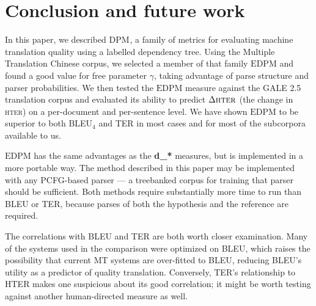 \documentclass[11pt]{article}
\newcommand{\DPM}[1]{\ensuremath{\mathrm{DPM}_{#1}}}
\newcommand{\myEDPM}[0]{\ensuremath{\mathrm{EDPM}}}
\begin{document}
\section{Conclusion and future work}
\label{sec:conclusion}


In this paper, we described \DPM{}, a family of metrics for evaluating
machine translation quality using a labelled dependency tree.  Using
the Multiple Translation Chinese corpus, we selected a member of that
family \myEDPM{} and found a good value for free parameter $\gamma$,
taking advantage of parse structure and parser probabilities.
%
We then tested the \myEDPM{} measure against the GALE 2.5 translation
corpus and evaluated its ability to predict $\Delta\textsc{hter}$
(the change in \textsc{hter}) on a per-document and per-sentence
level.  We have shown \myEDPM{} to be superior to both BLEU$_4$
and TER in most cases and for most of the subcorpora available to us.

\myEDPM{} has the same advantages as the
 \textbf{d\_*} measures, but is
implemented in a more portable way.  The method described in this
paper may be implemented with any PCFG-based parser --- a treebanked
corpus for training that parser should be sufficient.  Both methods
require substantially more time to run than BLEU or TER, because
parses of both the hypothesis and the reference are required.

The correlations with BLEU and TER are both worth closer examination.
%
Many of the systems used
in the comparison were optimized on BLEU, which raises the
possibility that current MT systems are over-fitted to BLEU, reducing
BLEU's utility as a predictor of quality translation. Conversely,
TER's relationship to HTER makes one suspicious about its good
correlation; it might be worth testing against another human-directed
measure as well.
\end{document}
